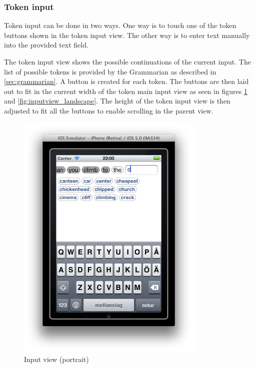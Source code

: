 \subsubsection{Token input}
Token input can be done in two ways. One way is to touch one of the token buttons shown in the token input view. The other way is to enter text manually into the provided text field.

The token input view shows the possible continuations of the current input. The list of possible tokens is provided by the Grammarian as described in \ref{sec:grammarian}. A button is created for each token. The buttons are then laid out to fit in the current width of the token main input view as seen in figures \ref{fig:inputview_portrait} and \ref{fig:inputview_landscape}. The height of the token input view is then adjusted to fit all the buttons to enable scrolling in the parent view.

\begin{figure}[htb]
\centering
\includegraphics[width=0.8\textwidth]{fig/inputview_portrait}
\caption{Input view (portrait)}
\label{fig:inputview_portrait}
\end{figure}

